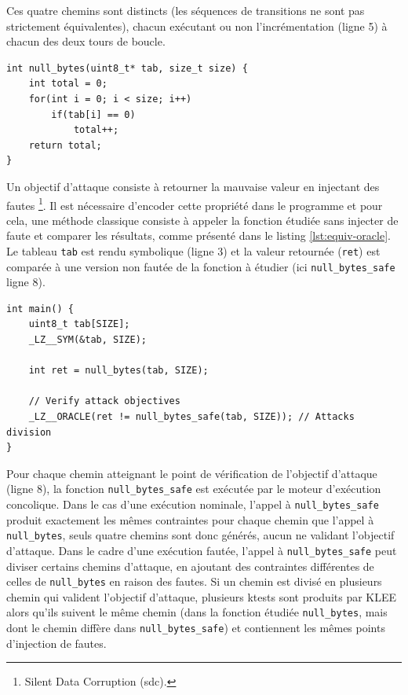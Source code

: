                 Ces quatre chemins sont distincts (les séquences de transitions ne sont pas strictement équivalentes), chacun exécutant ou non l'incrémentation (ligne 5) à chacun des deux tours de boucle. 
                
\begin{center}
\lstset{language=C,style=codeC} 
\begin{lstlisting}[caption=Fonction \texttt{null\_bytes}, label=lst:equiv]
int null_bytes(uint8_t* tab, size_t size) {
    int total = 0;
    for(int i = 0; i < size; i++)
        if(tab[i] == 0)
            total++;
    return total;
}
\end{lstlisting}
\end{center}
                    
                Un objectif d'attaque consiste à retourner la mauvaise valeur en injectant des fautes \footnote{Silent Data Corruption (\gls{sdc}).}.
                Il est nécessaire d'encoder cette propriété dans le programme et pour cela, une méthode classique consiste à appeler la fonction étudiée sans injecter de faute et comparer les résultats, comme présenté dans le listing \ref{lst:equiv-oracle}. 
                Le tableau \texttt{tab} est rendu symbolique (ligne 3) et la valeur retournée (\texttt{ret}) est comparée à une version non fautée de la fonction à étudier (ici \texttt{null\_bytes\_safe} ligne 8).
                    
\begin{center}
\lstset{language=C,style=codeC} 
\begin{lstlisting}[caption=Point d'entrée de l'analyse pour \texttt{null\_bytes}, label=lst:equiv-oracle]
int main() {
    uint8_t tab[SIZE];
    _LZ__SYM(&tab, SIZE);
    
    int ret = null_bytes(tab, SIZE);
    
    // Verify attack objectives
    _LZ__ORACLE(ret != null_bytes_safe(tab, SIZE)); // Attacks division
}
\end{lstlisting}
\end{center}                    
                Pour chaque chemin atteignant le point de vérification de l'objectif d'attaque (ligne 8), la fonction \texttt{null\_bytes\_safe} est exécutée par le moteur d'exécution concolique.
                Dans le cas d'une exécution nominale, l'appel à \texttt{null\_bytes\_safe} produit exactement les mêmes contraintes pour chaque chemin que l'appel à \texttt{null\_bytes}, seuls quatre chemins sont donc générés, aucun ne validant l'objectif d'attaque.
                Dans le cadre d'une exécution fautée, l'appel à \texttt{null\_bytes\_safe} peut diviser certains chemins d'attaque, en ajoutant des contraintes différentes de celles de \texttt{null\_bytes} en raison des fautes.
                Si un chemin est divisé en plusieurs chemin qui valident l'objectif d'attaque, plusieurs ktests sont produits par KLEE alors qu'ils suivent le même chemin (dans la fonction étudiée \texttt{null\_bytes}, mais dont le chemin diffère dans \texttt{null\_bytes\_safe}) et contiennent les mêmes points d'injection de fautes.
    
